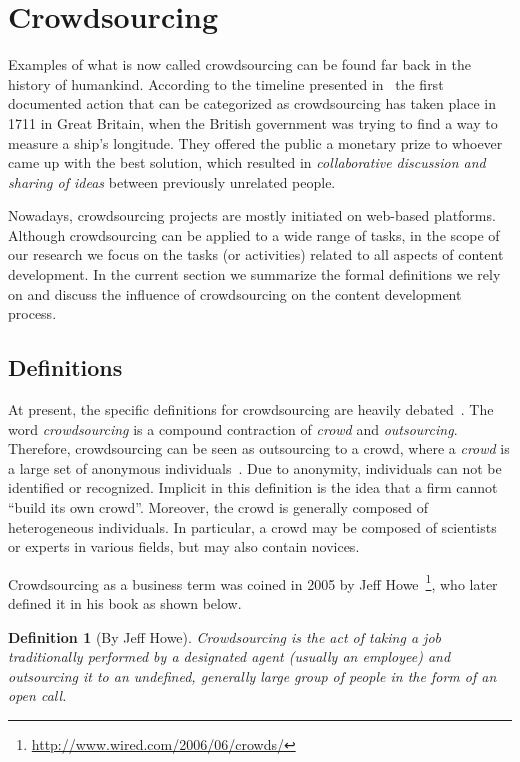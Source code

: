 \documentclass[PhD, Submit, ngerman,UKenglish,table]{scrbook}
\newtheorem{definition}{Definition}
\begin{document}
\section{Crowdsourcing}
Examples of what is now called crowdsourcing can be found far back in the history of humankind.
According to the timeline presented in~\cite{dawson2012getting} the first documented action that can be categorized as crowdsourcing has taken place in 1711 in Great Britain, when the British government was trying to find a way to measure a ship's longitude.
They offered the public a monetary prize to whoever came up with the best solution, which resulted in \emph{collaborative discussion and sharing of ideas} between previously unrelated people.

Nowadays, crowdsourcing projects are mostly initiated on web-based platforms.
Although crowdsourcing can be applied to a wide range of tasks, in the scope of our research we focus on the tasks (or activities) related to all aspects of content development.
In the current section we summarize the formal definitions we rely on and discuss the influence of crowdsourcing on the content development process.


\subsection{Definitions}
\label{sec:crowdsourcing_def}

At present, the specific definitions for crowdsourcing are heavily debated~\cite{estelles2012towards}.
The word \emph{crowdsourcing} is a compound contraction of \emph{crowd} and \emph{outsourcing}.
Therefore, crowdsourcing can be seen as outsourcing to a crowd, where a \emph{crowd} is a large set of anonymous individuals~\cite{surowiecki2005wisdom}.
Due to anonymity, individuals can not be identified or recognized. 
Implicit in this definition is the idea that a firm cannot “build its own crowd”. 
Moreover, the crowd is generally composed of heterogeneous individuals.
In particular, a crowd may be composed of scientists or experts in various fields, but may also contain novices.

Crowdsourcing as a business term was coined in 2005 by Jeff Howe~\footnote{\url{http://www.wired.com/2006/06/crowds/}}, who later defined it in his book as shown below.

\begin{definition}[By Jeff Howe]
Crowdsourcing is the act of taking a job traditionally performed by a designated agent (usually an employee) and outsourcing it to an undefined, generally large group of people in the form of an open call.
\end{definition}
\end{document}

